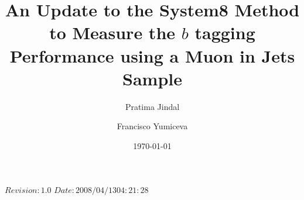 \RCS$Revision: 1.0 $
\RCS$Date: 2008/04/13 04:21:28 $

 
\def\bb{$b\overline{b}\;$}
\def\cc{$c\overline{c}\;$}
\def\ttbar{$t\overline{t}\;$}
\def\mttbar{$m_{t\overline{t}}\;$}
\def\Zp{${Z'}\;$}
\def\ddZ{$\mathrm{d}\overline{\mathrm{d}}$}
\def\ss{$\mathrm{s}\overline{\mathrm{s}}\;$}
\def\ssZ{$\mathrm{s}\overline{\mathrm{s}}$}
\def\zqq{$\mathrm{Z} \rightarrow \mathrm{q}\overline{\mathrm{q}}\;$}
\def\zcc{$\mathrm{Z} \rightarrow \mathrm{c}\overline{\mathrm{c}}\;$}
\def\zbb{$\mathrm{Z} \rightarrow \mathrm{b}\overline{\mathrm{b}}\;$}
\def\zuuZ{$\mathrm{Z} \rightarrow \mathrm{u}\overline{\mathrm{u}}$}
\def\gevc{~GeV/$c\;$}
\def\gevcc{~GeV/$c^{2}\;$}
\def\mum{~$\mu$m$\;$}
\def\pt{$p_T\;$}
\def\ptZ{$p_T$}
\def\Et{$E_T\;$}
\def\EtZ{$E_T$}
\def\ip{$IP\;$}
\def\ipZ{$IP$}
\def\dca{$dca\;$}
\def\prob{${\cal P}_{jet}\;$}
\def\probZ{${\cal P}_{jet}$}
\def\dr{$\Delta R\;$}
\def\pscat{$p_{scat}\;$}
\def\pscatZ{$p_{scat}$}
\def\sip{${\cal S}_{IP}\;$}
\def\ptrel{$p_{Trel}\;$}
\def\tag{${\cal P}_{jet}^+<$}

\title{\bf An Update to the System8 Method to
        Measure the $b$ tagging Performance using a Muon in Jets Sample}

\author[purdue]{Pratima Jindal}
\author[fnal]{Francisco Yumiceva}
\address[fnal]{Fermi National Accelerator Laboratory, Batavia, Illinois USA}  
\address[purdue]{Purdue University Calumet, Hammond, Indiana, USA}
\date{\today}
  



\maketitle %

